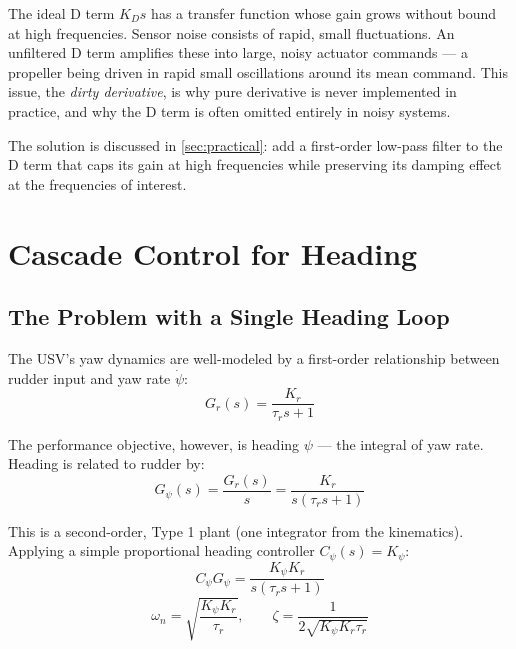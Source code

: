 \documentclass[../../book.tex]{subfiles}
\begin{document}
The ideal D term $K_D s$ has a transfer function whose gain grows without
bound at high frequencies.  Sensor noise consists of rapid, small fluctuations.
An unfiltered D term amplifies these into large, noisy actuator commands --- a
propeller being driven in rapid small oscillations around its mean command.
This issue, the \emph{dirty derivative}, is why pure derivative is never implemented in practice, and why the D term is often omitted entirely in noisy systems.

The solution is discussed in \cref{sec:practical}: add a first-order low-pass filter to
the D term that caps its gain at high frequencies while preserving its
damping effect at the frequencies of interest.


\section{Cascade Control for Heading}
\label{sec:cascade}

\subsection{The Problem with a Single Heading Loop}

The USV's yaw dynamics are well-modeled by a first-order relationship between
rudder input and yaw rate $\dot\psi$:
\begin{equation}
  G_r(s) = \frac{K_r}{\tau_r s + 1}
  \label{eq:yaw_rate_plant}
\end{equation}

The performance objective, however, is heading $\psi$ --- the integral of yaw
rate.  Heading is related to rudder by:
\begin{equation}
  G_\psi(s) = \frac{G_r(s)}{s} = \frac{K_r}{s(\tau_r s + 1)}
  \label{eq:heading_plant}
\end{equation}

This is a second-order, Type 1 plant (one integrator from the kinematics).
Applying a simple proportional heading controller $C_\psi(s) = K_\psi$:
\[
  C_\psi G_\psi = \frac{K_\psi K_r}{s(\tau_r s + 1)}
\]
\begin{equation}
  \omega_n = \sqrt{\frac{K_\psi K_r}{\tau_r}}, \qquad
  \zeta = \frac{1}{2\sqrt{K_\psi K_r \tau_r}}
  \label{eq:heading_p}
\end{equation}
\end{document}
